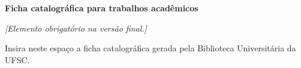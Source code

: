 \clearpage
\thispagestyle{empty}
\vspace*{\fill}
\begin{center}
\begin{minipage}{0.78\textwidth}
\centering
\textbf{Ficha catalográfica para trabalhos acadêmicos}

\vspace{0.8cm}
\textit{[Elemento obrigatório na versão final.]}

\vspace{0.5cm}
Insira neste espaço a ficha catalográfica gerada pela Biblioteca Universitária da UFSC.
\end{minipage}
\end{center}
\vspace*{\fill}
\clearpage
